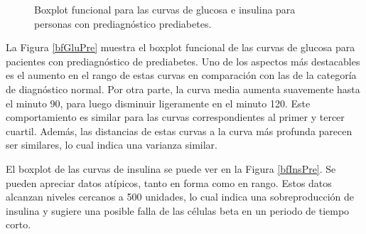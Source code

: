 \begin{figure}[H]
 \centering
    \caption{Boxplot funcional para las curvas de glucosa e insulina para personas con prediagnóstico prediabetes.}
    \label{fig:bfPrediabetes}
\end{figure}

La Figura \ref{bfGluPre} muestra el boxplot funcional de las curvas de glucosa para pacientes con prediagnóstico de prediabetes. Uno de los aspectos más destacables es el aumento en el rango de estas curvas en comparación con las de la categoría de diagnóstico normal. Por otra parte, la curva media aumenta suavemente hasta el minuto 90, para luego disminuir ligeramente en el minuto 120. Este comportamiento es similar para las curvas correspondientes al primer y tercer cuartil. Además, las distancias de estas curvas a la curva más profunda parecen ser similares, lo cual indica una varianza similar.

El boxplot de las curvas de insulina se puede ver en la Figura \ref{bfInsPre}. Se pueden apreciar datos atípicos, tanto en forma como en rango. Estos datos alcanzan niveles cercanos a 500 unidades, lo cual indica una sobreproducción de insulina y sugiere una posible falla de las células beta en un periodo de tiempo corto.

